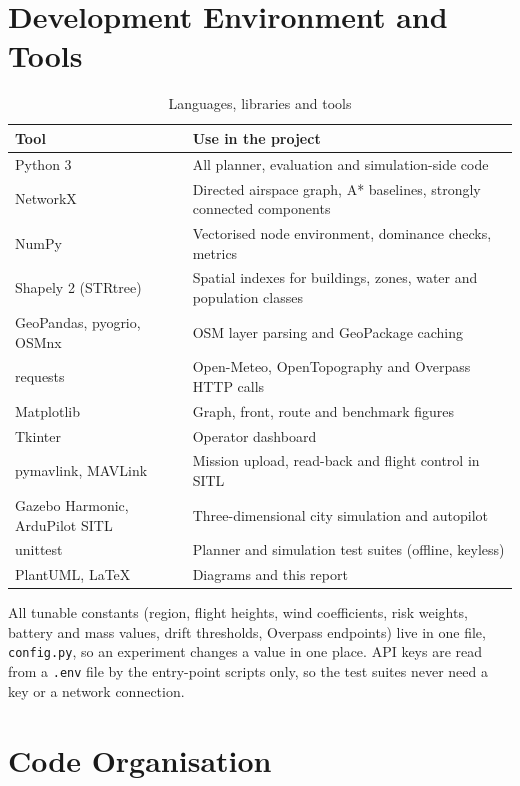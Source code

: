 \documentclass{ssnreview}
\begin{document}
\section{Development Environment and Tools}

\begin{table}[H]
\centering\caption{Languages, libraries and tools}\label{tab:tools}\small
\begin{tabularx}{\textwidth}{L{3.6cm} Y}
\toprule
\textbf{Tool} & \textbf{Use in the project}\\
\midrule
Python 3 & All planner, evaluation and simulation-side code\\
NetworkX \cite{r5} & Directed airspace graph, A* baselines, strongly connected components\\
NumPy & Vectorised node environment, dominance checks, metrics\\
Shapely 2 (STRtree) & Spatial indexes for buildings, zones, water and population classes\\
GeoPandas, pyogrio, OSMnx \cite{r4} & OSM layer parsing and GeoPackage caching\\
requests & Open-Meteo, OpenTopography and Overpass HTTP calls\\
Matplotlib & Graph, front, route and benchmark figures\\
Tkinter & Operator dashboard\\
pymavlink, MAVLink \cite{r7} & Mission upload, read-back and flight control in SITL\\
Gazebo Harmonic, ArduPilot SITL & Three-dimensional city simulation and autopilot\\
unittest & Planner and simulation test suites (offline, keyless)\\
PlantUML, \LaTeX & Diagrams and this report\\
\bottomrule
\end{tabularx}
\end{table}

All tunable constants (region, flight heights, wind coefficients, risk weights, battery
and mass values, drift thresholds, Overpass endpoints) live in one file,
\texttt{config.py}, so an experiment changes a value in one place. API keys are read from
a \texttt{.env} file by the entry-point scripts only, so the test suites never need a key
or a network connection.

\section{Code Organisation}
\end{document}
